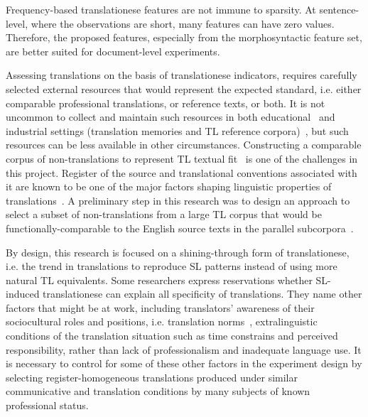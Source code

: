 Frequency-based translationese features are not immune to sparsity. At sentence-level, where the observations are short, many features can have zero values. Therefore, the proposed features, especially from the morphosyntactic feature set, are better suited for document-level experiments.

Assessing translations on the basis of translationese indicators, requires carefully selected external resources that would represent the expected standard, i.e. either comparable professional translations, or reference texts, or both. It is not uncommon to collect and maintain such resources in both educational~\citep{Bowker2001} and industrial settings (translation memories and \gls*{TL} reference corpora)~\citep{Massey2019}, but such resources can be less available in other circumstances. 
Constructing a comparable corpus of non-translations to represent \gls*{TL} textual fit~\citep{Chesterman2004} is one of the challenges in this project. Register of the source and translational conventions associated with it are known to be one of the major factors shaping linguistic properties of translations~\cite{Lapshinova2017}. A preliminary step in this research was to design an approach to select a subset of non-translations from a large TL corpus that would be functionally-comparable to the English source texts in the parallel subcorpora~\cite{Kunilovskaya2019crossling}.

By design, this research is focused on a shining-through form of translationese, i.e. the trend in translations to reproduce SL patterns instead of using more natural TL equivalents. Some researchers express reservations whether SL-induced translationese can explain all specificity of translations. They name other factors that might be at work, including translators' awareness of their sociocultural roles and positions, i.e. translation norms~\cite{Laviosa2008, Delaere2012}, extralinguistic conditions of the translation situation such as time constrains and perceived responsibility, rather than lack of professionalism and inadequate language use. It is necessary to control for some of these other factors in the experiment design by selecting register-homogeneous translations produced under similar communicative and translation conditions by many subjects of known professional status.

